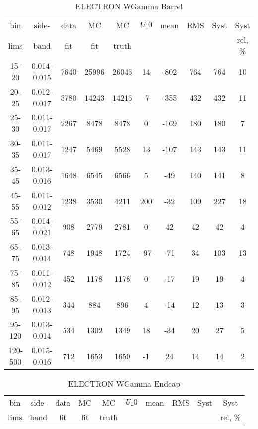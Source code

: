 \documentclass{beamer}
\begin{document}
\begin{frame}
\begin{table}[h]
  	\tiny
  \begin{center}
  \caption{ELECTRON WGamma Barrel}
  \begin{tabular}{|c|c|c|c|c|c|c|c|c|c|}
    bin & side- & data & MC & MC    & $U\_{0}$ & mean & RMS & Syst & Syst \\ 
    lims & band & fit & fit & truth &       &      &     &      & rel, \% \\ \hline
    15-20 & 0.014-0.015 & 7640 & 25996 & 26046 & 14 & -802 & 764 & 764 & 10  \\ \hline
    20-25 & 0.012-0.017 & 3780 & 14243 & 14216 & -7 & -355 & 432 & 432 & 11  \\ \hline
    25-30 & 0.011-0.017 & 2267 & 8478 & 8478 & 0 & -169 & 180 & 180 & 7  \\ \hline
    30-35 & 0.011-0.017 & 1247 & 5469 & 5528 & 13 & -107 & 143 & 143 & 11  \\ \hline
    35-45 & 0.013-0.016 & 1648 & 6545 & 6566 & 5 & -49 & 140 & 141 & 8  \\ \hline
    45-55 & 0.011-0.012 & 1238 & 3530 & 4211 & 200 & -32 & 109 & 227 & 18  \\ \hline
    55-65 & 0.014-0.021 & 908 & 2779 & 2781 & 0 & 42 & 42 & 42 & 4  \\ \hline
    65-75 & 0.013-0.014 & 748 & 1948 & 1724 & -97 & -71 & 34 & 103 & 13  \\ \hline
    75-85 & 0.011-0.012 & 452 & 1178 & 1178 & 0 & -17 & 19 & 19 & 4  \\ \hline
    85-95 & 0.012-0.013 & 344 & 884 & 896 & 4 & -14 & 12 & 13 & 3  \\ \hline
    95-120 & 0.013-0.014 & 534 & 1302 & 1349 & 18 & -34 & 20 & 27 & 5  \\ \hline
    120-500 & 0.015-0.016 & 712 & 1653 & 1650 & -1 & 24 & 14 & 14 & 2  \\ \hline
  \end{tabular}
  \label{tab:systSbVar_Meth1_ELECTRON_WGamma_Barrel}
  \end{center}
\end{table}
\begin{table}[h]
  	\tiny
  \begin{center}
  \caption{ELECTRON WGamma Endcap}
  \begin{tabular}{|c|c|c|c|c|c|c|c|c|c|}
    bin & side- & data & MC & MC    & $U\_{0}$ & mean & RMS & Syst & Syst \\ 
    lims & band & fit & fit & truth &       &      &     &      & rel, \% \\ \hline

\end{tabular}
\end{center}
\end{table}
\end{frame}
\end{document}
